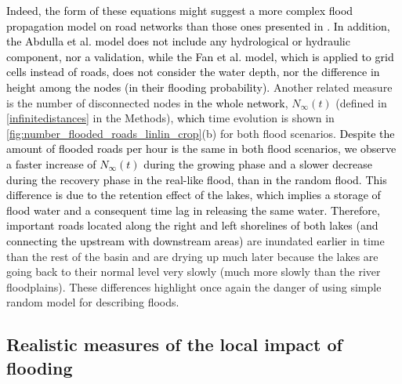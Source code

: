 \documentclass[twocolumn,fleqn,10pt]{wlscirep}
\begin{document}
\textcolor{black}{
Indeed, the form of these equations might suggest a more complex flood propagation model on road networks than those ones presented in \cite{Abdulla2020_SIS,Fan2020}. In addition, the Abdulla et al. \cite{Abdulla2020_SIS} model does not include any hydrological or hydraulic component, nor a validation, while the Fan et al. \cite{Fan2020} model, which is applied to grid cells instead of roads, does not consider the water depth, nor the difference in height among the nodes (in their flooding probability).}
%
Another related measure is the number of disconnected nodes \textcolor{black}{in the whole network}, $N_\infty(t)$ (defined in \cref{infinitedistances} in the Methods), \textcolor{black}{which} time evolution is shown in \cref{fig:number_flooded_roads_linlin_crop}(b) for both flood scenarios. \textcolor{black}{Despite the amount of flooded roads per hour is the same in both flood scenarios, we observe a faster increase of $N_\infty(t)$ during the growing phase and a slower decrease during the recovery phase in the real-like flood, than in the random flood.}
\textcolor{black}{This difference is due to the retention effect of the lakes, which implies a storage of flood water and a consequent time lag in releasing the same water.} 
\textcolor{black}{Therefore, important roads located along the right and left shorelines of both lakes (and connecting the upstream with downstream areas)} are inundated \textcolor{black}{earlier} in time than the rest of the basin and are drying up much later because the lakes are going back to their normal level very slowly (much more slowly than the river floodplains). These differences highlight once again the danger of using simple random model for describing floods. 

  



\subsection*{Realistic measures of the local impact of flooding}
\end{document}
